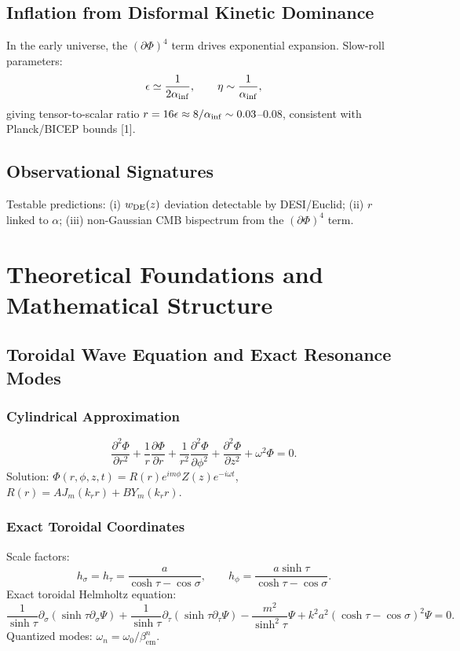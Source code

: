 \documentclass[12pt, a4paper]{article}
\begin{document}
\subsection{Inflation from Disformal Kinetic Dominance}
In the early universe, the $(\partial \Phi)^4$ term drives exponential expansion. Slow-roll parameters:
\begin{equation}
\epsilon \simeq \frac{1}{2\alpha_{\rm inf}}, \qquad \eta \sim \frac{1}{\alpha_{\rm inf}},
\end{equation}
giving tensor-to-scalar ratio $r = 16\epsilon \approx 8/\alpha_{\rm inf} \sim 0.03$--$0.08$, consistent with Planck/BICEP bounds [1].

\subsection{Observational Signatures}
Testable predictions: (i) $w_{\rm DE}(z)$ deviation detectable by DESI/Euclid; (ii) $r$ linked to $\alpha$; (iii) non-Gaussian CMB bispectrum from the $(\partial \Phi)^4$ term.

\section{Theoretical Foundations and Mathematical Structure}
\label{sec:math}

\subsection{Toroidal Wave Equation and Exact Resonance Modes}
\subsubsection{Cylindrical Approximation}
\begin{equation}
\frac{\partial^2\Phi}{\partial r^2} +\frac{1}{r}\frac{\partial\Phi}{\partial r} +\frac{1}{r^2}\frac{\partial^2\Phi}{\partial\phi^2} +\frac{\partial^2\Phi}{\partial z^2} +\omega^2\Phi = 0.
\end{equation}
Solution: $\Phi (r,\phi ,z,t) = R(r)e^{im\phi}Z(z)e^{- i\omega t}$, $R(r) = AJ_{m}(k_{r}r) + BY_{m}(k_{r}r)$.

\subsubsection{Exact Toroidal Coordinates}
Scale factors:
\begin{equation}
h_{\sigma} = h_{\tau} = \frac{a}{\cosh\tau - \cos\sigma},\qquad h_{\phi} = \frac{a\sinh\tau}{\cosh\tau - \cos\sigma}.
\end{equation}
Exact toroidal Helmholtz equation:
\begin{equation}
\frac{1}{\sinh\tau}\partial_{\sigma}(\sinh\tau \partial_{\sigma}\Psi) + \frac{1}{\sinh\tau}\partial_{\tau}(\sinh\tau \partial_{\tau}\Psi) - \frac{m^{2}}{\sinh^{2}\tau}\Psi +k^{2}a^{2}(\cosh\tau -\cos \sigma)^{2}\Psi = 0.
\end{equation}
Quantized modes: $\omega_{n} = \omega_{0} / \beta_{\mathrm{em}}^{n}$.
\end{document}
